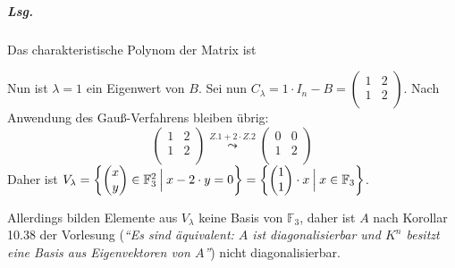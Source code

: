 \documentclass{scrreprt}
\begin{document}
\begin{enumerate}[(a)]
  \subparagraph{Lsg.} Das charakteristische Polynom der Matrix ist
  Nun ist $\lambda = 1$ ein Eigenwert von $B$.
  Sei nun $C_\lambda = 1 \cdot I_n - B = \begin{pmatrix}
    1 & 2 \\
    1 & 2 \\
  \end{pmatrix}$.
  Nach Anwendung des Gauß-Verfahrens bleiben übrig:
  \[
    \begin{pmatrix}
      1 & 2 \\
      1 & 2 \\
    \end{pmatrix}
    \overset{Z.1 + 2 \cdot Z.2}\leadsto
    \begin{pmatrix}
      0 & 0 \\
      1 & 2 \\
    \end{pmatrix}
  \]
  Daher ist $V_{\lambda} = \qty{
    \begin{pmatrix}x\\y\end{pmatrix} \in \mathbb{F}_3^2
    \:{\Big |}\:
    x -2 \cdot y = 0
  } = \qty{
    \begin{pmatrix}1\\1\end{pmatrix} \cdot x
    \:{\Big |}\:
    x \in \mathbb{F}_3
  }$.

  Allerdings bilden Elemente aus $V_\lambda$ keine Basis von $\mathbb{F}_3$,
  daher ist $A$ nach Korollar 10.38 der Vorlesung (\emph{``Es sind äquivalent:
    $A$ ist diagonalisierbar und $K^n$ besitzt eine Basis aus Eigenvektoren von
    $A$''}) nicht diagonalisierbar.


\end{enumerate}
\end{document}
